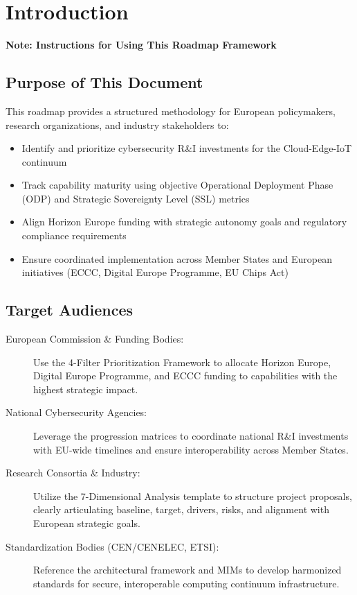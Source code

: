 \documentclass[12pt,a4paper]{article}
\begin{document}
\section{Introduction}

\newpage
\textbf{Note: Instructions for Using This Roadmap Framework}

\subsection*{Purpose of This Document}
This roadmap provides a structured methodology for European policymakers, research organizations, and industry stakeholders to:
\begin{itemize}
    \item Identify and prioritize cybersecurity R\&I investments for the Cloud-Edge-IoT continuum
    \item Track capability maturity using objective Operational Deployment Phase (ODP) and Strategic Sovereignty Level (SSL) metrics
    \item Align Horizon Europe funding with strategic autonomy goals and regulatory compliance requirements
    \item Ensure coordinated implementation across Member States and European initiatives (ECCC, Digital Europe Programme, EU Chips Act)
\end{itemize}

\subsection*{Target Audiences}
\begin{description}
    \item[European Commission \& Funding Bodies:] Use the 4-Filter Prioritization Framework to allocate Horizon Europe, Digital Europe Programme, and ECCC funding to capabilities with the highest strategic impact.
    
    \item[National Cybersecurity Agencies:] Leverage the progression matrices to coordinate national R\&I investments with EU-wide timelines and ensure interoperability across Member States.
    
    \item[Research Consortia \& Industry:] Utilize the 7-Dimensional Analysis template to structure project proposals, clearly articulating baseline, target, drivers, risks, and alignment with European strategic goals.
    
    \item[Standardization Bodies (CEN/CENELEC, ETSI):] Reference the architectural framework and MIMs to develop harmonized standards for secure, interoperable computing continuum infrastructure.
\end{description}
\end{document}
